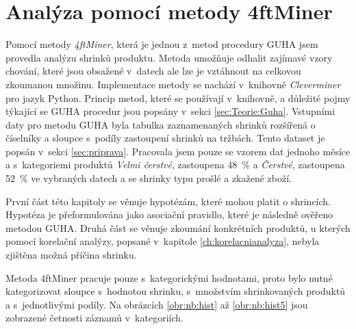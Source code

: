 \chapter{Analýza pomocí metody 4ftMiner}
\label{ch:cleverminer}

Pomocí metody \emph{4ftMiner}, která je jednou z~metod procedury GUHA jsem provedla analýzu shrinků produktu. Metoda umožňuje odhalit zajímavé vzory chování, které jsou obsažené v~datech ale lze je vztáhnout na celkovou zkoumanou množinu. Implementace metody se nachází v~knihovně \emph{Cleverminer} pro jazyk Python. Princip metod, které se používají v~knihovně, a důležité pojmy týkající se GUHA procedur jsou popsány v~sekci \ref*{sec:Teorie:Guha}. Vstupními daty pro metodu GUHA byla tabulka zaznamenaných shrinků rozšířená o číselníky a sloupce s~podíly zastoupení shrinků na tržbách. Tento dataset je popsán v~sekci \ref{sec:priprava}.
Pracovala jsem pouze se vzorem dat jednoho měsíce a s~kategoriemi produktů \emph{Velmi čerstvé}, zastoupena 48~\% a \emph{Čerstvé}, zastoupena 52~\% ve vybraných datech a se shrinky typu prošlé a zkažené zboží. 

První část této kapitoly se věnuje hypotézám, které mohou platit o shrincích. Hypotéza je přeformulována jako asociační pravidlo, které je následně ověřeno metodou GUHA. Druhá část se věnuje zkoumání konkrétních produktů, u kterých pomocí korelační analýzy, popsané v~kapitole \ref*{ch:korelacnianalyza}, nebyla zjištěna možná příčina shrinku.

Metoda 4ftMiner pracuje pouze s~kategorickými hodnotami, proto bylo nutné kategorizovat sloupce s~hodnotou shrinku, s~množstvím shrinkovaných produktů a s~jednotlivými podíly. Na obrázcích \ref*{obr:nb:hist} až \ref{obr:nb:hist5} jsou zobrazené četnosti záznamů v~kategoriích.

